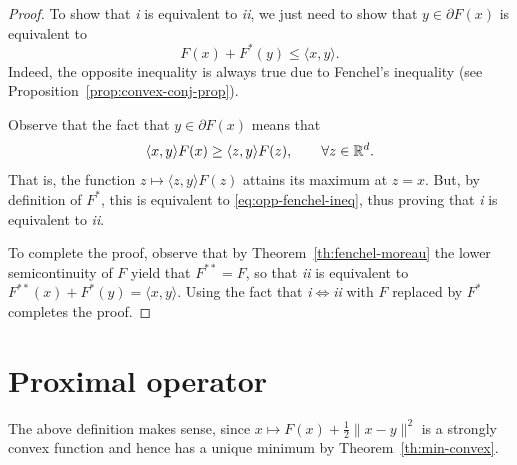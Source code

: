  \begin{proof}
     To show that \emph{i} is equivalent to \emph{ii}, we just need to show that $y\in \partial F(x)$ is equivalent to
     \begin{equation}
         \label{eq:opp-fenchel-ineq}
         F(x)+F^*(y) \le \langle  x,y\rangle.
     \end{equation}
     Indeed, the opposite inequality is always true due to Fenchel's inequality (see Proposition~\ref{prop:convex-conj-prop}).
 
     Observe that the fact that $y\in\partial F(x)$ means that
     \begin{equation}
         \langle x,y\rangle F(x)
         \ge \langle z,y\rangle F(z), \qquad \forall z\in \mathbb{R}^d.
     \end{equation}
     That is, the function $z\mapsto \langle z,y\rangle F(z)$ attains its maximum at $z=x$. But, by definition of $F^*$, this is equivalent to \eqref{eq:opp-fenchel-ineq}, thus proving that \emph{i} is equivalent to \emph{ii}.
 
     To complete the proof, observe that by Theorem~\ref{th:fenchel-moreau} the lower semicontinuity of $F$ yield that $F^{**}=F$, so that \emph{ii} is equivalent to $F^{**}(x)+F^*(y)=\langle x,y\rangle$. Using the fact that \emph{i}$\iff$\emph{ii} with $F$ replaced by $F^*$ completes the proof.
 \end{proof}
 
 \section{Proximal operator}
 \label{sec:proximal}
 
 
 The above definition makes sense, since $x\mapsto F(x) + \frac12 \|x-y\|^2$ is a strongly convex function and hence has a unique minimum by Theorem~\ref{th:min-convex}.
 
 
